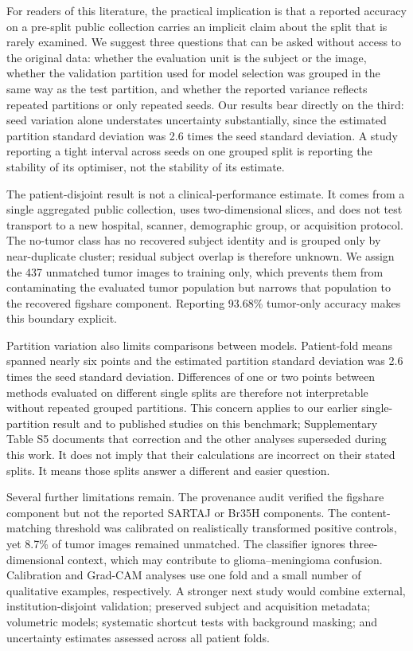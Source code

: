 ﻿\documentclass[twocolumn]{article}
\begin{document}
For readers of this literature, the practical implication is that a reported accuracy on a pre-split public collection carries an implicit claim about the split that is rarely examined. We suggest three questions that can be asked without access to the original data: whether the evaluation unit is the subject or the image, whether the validation partition used for model selection was grouped in the same way as the test partition, and whether the reported variance reflects repeated partitions or only repeated seeds. Our results bear directly on the third: seed variation alone understates uncertainty substantially, since the estimated partition standard deviation was 2.6 times the seed standard deviation. A study reporting a tight interval across seeds on one grouped split is reporting the stability of its optimiser, not the stability of its estimate.

The patient-disjoint result is not a clinical-performance estimate. It comes from a single aggregated public collection, uses two-dimensional slices, and does not test transport to a new hospital, scanner, demographic group, or acquisition protocol. The no-tumor class has no recovered subject identity and is grouped only by near-duplicate cluster; residual subject overlap is therefore unknown. We assign the 437 unmatched tumor images to training only, which prevents them from contaminating the evaluated tumor population but narrows that population to the recovered figshare component. Reporting 93.68\% tumor-only accuracy makes this boundary explicit.

Partition variation also limits comparisons between models. Patient-fold means spanned nearly six points and the estimated partition standard deviation was 2.6 times the seed standard deviation. Differences of one or two points between methods evaluated on different single splits are therefore not interpretable without repeated grouped partitions. This concern applies to our earlier single-partition result and to published studies on this benchmark; Supplementary Table S5 documents that correction and the other analyses superseded during this work. It does not imply that their calculations are incorrect on their stated splits. It means those splits answer a different and easier question.

Several further limitations remain. The provenance audit verified the figshare component but not the reported SARTAJ or Br35H components. The content-matching threshold was calibrated on realistically transformed positive controls, yet 8.7\% of tumor images remained unmatched. The classifier ignores three-dimensional context, which may contribute to glioma--meningioma confusion. Calibration and Grad-CAM analyses use one fold and a small number of qualitative examples, respectively. A stronger next study would combine external, institution-disjoint validation; preserved subject and acquisition metadata; volumetric models; systematic shortcut tests with background masking; and uncertainty estimates assessed across all patient folds.
\end{document}
